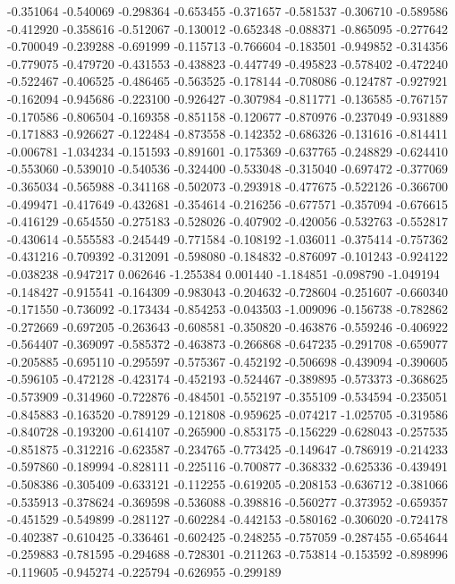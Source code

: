 -0.351064
-0.540069
-0.298364
-0.653455
-0.371657
-0.581537
-0.306710
-0.589586
-0.412920
-0.358616
-0.512067
-0.130012
-0.652348
-0.088371
-0.865095
-0.277642
-0.700049
-0.239288
-0.691999
-0.115713
-0.766604
-0.183501
-0.949852
-0.314356
-0.779075
-0.479720
-0.431553
-0.438823
-0.447749
-0.495823
-0.578402
-0.472240
-0.522467
-0.406525
-0.486465
-0.563525
-0.178144
-0.708086
-0.124787
-0.927921
-0.162094
-0.945686
-0.223100
-0.926427
-0.307984
-0.811771
-0.136585
-0.767157
-0.170586
-0.806504
-0.169358
-0.851158
-0.120677
-0.870976
-0.237049
-0.931889
-0.171883
-0.926627
-0.122484
-0.873558
-0.142352
-0.686326
-0.131616
-0.814411
-0.006781
-1.034234
-0.151593
-0.891601
-0.175369
-0.637765
-0.248829
-0.624410
-0.553060
-0.539010
-0.540536
-0.324400
-0.533048
-0.315040
-0.697472
-0.377069
-0.365034
-0.565988
-0.341168
-0.502073
-0.293918
-0.477675
-0.522126
-0.366700
-0.499471
-0.417649
-0.432681
-0.354614
-0.216256
-0.677571
-0.357094
-0.676615
-0.416129
-0.654550
-0.275183
-0.528026
-0.407902
-0.420056
-0.532763
-0.552817
-0.430614
-0.555583
-0.245449
-0.771584
-0.108192
-1.036011
-0.375414
-0.757362
-0.431216
-0.709392
-0.312091
-0.598080
-0.184832
-0.876097
-0.101243
-0.924122
-0.038238
-0.947217
0.062646
-1.255384
0.001440
-1.184851
-0.098790
-1.049194
-0.148427
-0.915541
-0.164309
-0.983043
-0.204632
-0.728604
-0.251607
-0.660340
-0.171550
-0.736092
-0.173434
-0.854253
-0.043503
-1.009096
-0.156738
-0.782862
-0.272669
-0.697205
-0.263643
-0.608581
-0.350820
-0.463876
-0.559246
-0.406922
-0.564407
-0.369097
-0.585372
-0.463873
-0.266868
-0.647235
-0.291708
-0.659077
-0.205885
-0.695110
-0.295597
-0.575367
-0.452192
-0.506698
-0.439094
-0.390605
-0.596105
-0.472128
-0.423174
-0.452193
-0.524467
-0.389895
-0.573373
-0.368625
-0.573909
-0.314960
-0.722876
-0.484501
-0.552197
-0.355109
-0.534594
-0.235051
-0.845883
-0.163520
-0.789129
-0.121808
-0.959625
-0.074217
-1.025705
-0.319586
-0.840728
-0.193200
-0.614107
-0.265900
-0.853175
-0.156229
-0.628043
-0.257535
-0.851875
-0.312216
-0.623587
-0.234765
-0.773425
-0.149647
-0.786919
-0.214233
-0.597860
-0.189994
-0.828111
-0.225116
-0.700877
-0.368332
-0.625336
-0.439491
-0.508386
-0.305409
-0.633121
-0.112255
-0.619205
-0.208153
-0.636712
-0.381066
-0.535913
-0.378624
-0.369598
-0.536088
-0.398816
-0.560277
-0.373952
-0.659357
-0.451529
-0.549899
-0.281127
-0.602284
-0.442153
-0.580162
-0.306020
-0.724178
-0.402387
-0.610425
-0.336461
-0.602425
-0.248255
-0.757059
-0.287455
-0.654644
-0.259883
-0.781595
-0.294688
-0.728301
-0.211263
-0.753814
-0.153592
-0.898996
-0.119605
-0.945274
-0.225794
-0.626955
-0.299189
